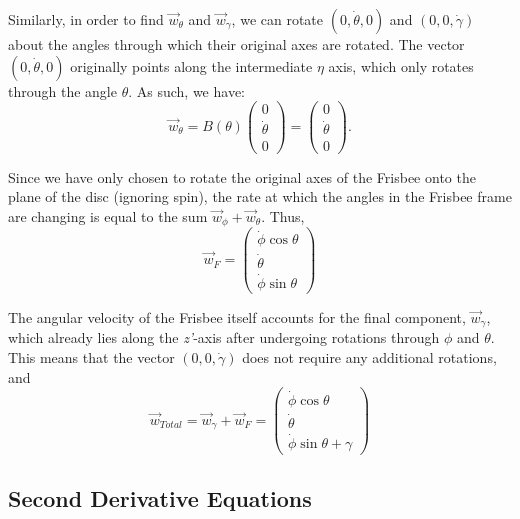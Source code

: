 \documentclass[a4paper,12pt, oneside]{article}
\begin{document}
Similarly, in order to find $\vec{w}_\theta$ and $\vec{w}_\gamma$, we can rotate $(0, \dot\theta, 0)$ and $(0, 0, \dot\gamma)$ about the angles through which their original axes are rotated. The vector $(0, \dot\theta, 0)$ originally points along the intermediate $\eta$ axis, which only rotates through the angle $\theta$. As such, we have:
\begin{equation*}
  \vec{w}_\theta=B(\theta)\left(\begin{array}{ccc}
    0\\
    \dot\theta \\
    0
  \end{array} 
  \right)=\left(\begin{array}{ccc}
    0 \\ 
    \dot\theta \\
    0
  \end{array}\right).
\end{equation*}

Since we have only chosen to rotate the original axes of the Frisbee onto the plane of the disc (ignoring spin), the rate at which the angles in the Frisbee frame are changing is equal to the sum $\vec{w}_\phi+\vec{w}_\theta$. Thus,
\begin{equation*}
\vec{w}_F=\left(\begin{array}{ccc}\dot\phi\cos\theta\\\dot\theta\\\dot\phi\sin\theta\end{array} \right)
\end{equation*}

The angular velocity of the Frisbee itself accounts for the final component, $\vec{w}_\gamma$, which already lies along the \textit{z'}-axis after undergoing rotations through $\phi$ and $\theta$. This means that the vector $(0, 0, \dot\gamma)$ does not require any additional rotations, and 
\begin{equation*}
\vec{w}_{Total}=\vec{w}_\gamma+\vec{w}_F=\left(\begin{array}{ccc}\dot\phi\cos\theta\\\dot\theta\\\dot\phi\sin\theta+\gamma\end{array} \right)
\end{equation*}

\subsection{Second Derivative Equations}
\end{document}
